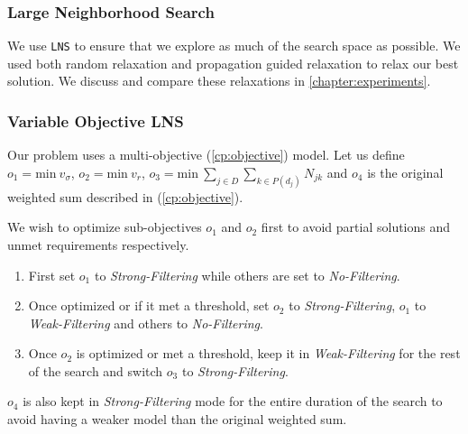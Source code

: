 \documentclass[../../thesis.tex]{subfiles}
\begin{document}
\subsubsection{Large Neighborhood Search}

We use \texttt{LNS} to ensure that we explore as much of the search space as possible. 
We used both random relaxation and propagation guided relaxation \cite{Propagation:LNS} to relax 
our best solution. We discuss and compare these relaxations in \autoref{chapter:experiments}.


\subsubsection{Variable Objective LNS}
\label{cp:volns}

Our problem uses a multi-objective (\ref{cp:objective}) model. 
Let us define $o_1 = \text{min} \ v_{\sigma}$, $o_2 = {\text{min} \ v_r}$, $o_3 = {\text{min} \ \sum_{j \in D} \sum_{k \in P(d_j)} N_{jk}}$
and $o_4$ is the original weighted sum described in (\ref{cp:objective}).


We wish to optimize sub-objectives $o_1$ and $o_2$ first to avoid partial solutions and unmet requirements respectively. 

\begin{enumerate}
  \item First set $o_1$ to \emph{Strong-Filtering} while others are set to \emph{No-Filtering}.
  \item Once optimized or if it met a threshold, set $o_2$ to \emph{Strong-Filtering}, $o_1$ to \emph{Weak-Filtering} and others to \emph{No-Filtering}.
  \item Once $o_2$ is optimized or met a threshold, keep it in \emph{Weak-Filtering} for the rest of the search and switch $o_3$ to \emph{Strong-Filtering}.
\end{enumerate}

$o_4$ is also kept in \emph{Strong-Filtering} mode for the entire duration of the search to avoid having a weaker model than the original weighted sum.
\end{document}
